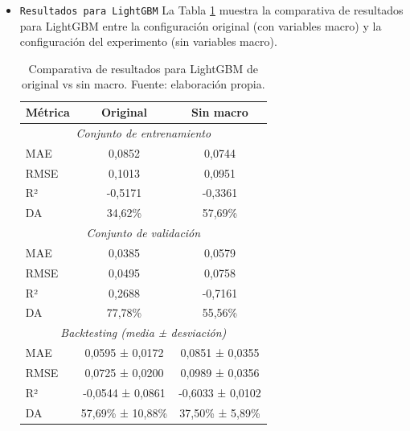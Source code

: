 \begin{enumerate}
\begin{itemize}
        La diferencia más notable se aprecia en las gráficas de predicción versus valor real. Mientras que el modelo original de Gradient Boosting mostraba un seguimiento razonable de la tendencia real, el modelo sin macro produce predicciones prácticamente horizontales, centradas en la media histórica, lo que indica una pérdida total de capacidad predictiva.

        \item \texttt{Resultados para LightGBM}
        La Tabla \ref{tab:experimento_lgb} muestra la comparativa de resultados para LightGBM entre la configuración original (con variables macro) y la configuración del experimento (sin variables macro).

        \begin{table}[H]
        \centering
        \begin{tabular}{|l|c|c|}
        \hline
        \textbf{Métrica} & \textbf{Original} & \textbf{Sin macro} \\
        \hline
        \multicolumn{3}{|c|}{\textit{Conjunto de entrenamiento}} \\
        \hline
        MAE & 0,0852 & 0,0744 \\
        RMSE & 0,1013 & 0,0951 \\
        R² & -0,5171 & -0,3361 \\
        DA & 34,62\% & 57,69\% \\
        \hline
        \multicolumn{3}{|c|}{\textit{Conjunto de validación}} \\
        \hline
        MAE & 0,0385 & 0,0579 \\
        RMSE & 0,0495 & 0,0758 \\
        R² & 0,2688 & -0,7161 \\
        DA & 77,78\% & 55,56\% \\
        \hline
        \multicolumn{3}{|c|}{\textit{Backtesting (media ± desviación)}} \\
        \hline
        MAE & 0,0595 ± 0,0172 & 0,0851 ± 0,0355 \\
        RMSE & 0,0725 ± 0,0200 & 0,0989 ± 0,0356 \\
        R² & -0,0544 ± 0,0861 & -0,6033 ± 0,0102 \\
        DA & 57,69\% ± 10,88\% & 37,50\% ± 5,89\% \\
        \hline
        \end{tabular}
        \label{tab:experimento_lgb}
        \caption{Comparativa de resultados para LightGBM de original vs sin macro. Fuente: elaboración propia.}
        \end{table}


\end{itemize}
\end{enumerate}
